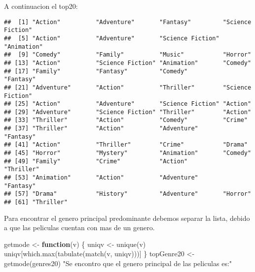 \documentclass[
]{article}
\newenvironment{Shaded}{\begin{snugshade}}{\end{snugshade}}
\newcommand{\AttributeTok}[1]{\textcolor[rgb]{0.77,0.63,0.00}{#1}}
\newcommand{\ConstantTok}[1]{\textcolor[rgb]{0.00,0.00,0.00}{#1}}
\newcommand{\ControlFlowTok}[1]{\textcolor[rgb]{0.13,0.29,0.53}{\textbf{#1}}}
\newcommand{\DecValTok}[1]{\textcolor[rgb]{0.00,0.00,0.81}{#1}}
\newcommand{\FunctionTok}[1]{\textcolor[rgb]{0.00,0.00,0.00}{#1}}
\newcommand{\NormalTok}[1]{#1}
\newcommand{\OtherTok}[1]{\textcolor[rgb]{0.56,0.35,0.01}{#1}}
\newcommand{\SpecialCharTok}[1]{\textcolor[rgb]{0.00,0.00,0.00}{#1}}
\newcommand{\StringTok}[1]{\textcolor[rgb]{0.31,0.60,0.02}{#1}}
\begin{document}
A continuacion el top20:

\begin{Shaded}
\end{Shaded}

\begin{verbatim}
##  [1] "Action"          "Adventure"       "Fantasy"         "Science Fiction"
##  [5] "Action"          "Adventure"       "Science Fiction" "Animation"      
##  [9] "Comedy"          "Family"          "Music"           "Horror"         
## [13] "Action"          "Science Fiction" "Animation"       "Comedy"         
## [17] "Family"          "Fantasy"         "Comedy"          "Fantasy"        
## [21] "Adventure"       "Action"          "Thriller"        "Science Fiction"
## [25] "Action"          "Adventure"       "Science Fiction" "Action"         
## [29] "Adventure"       "Science Fiction" "Thriller"        "Action"         
## [33] "Thriller"        "Action"          "Comedy"          "Crime"          
## [37] "Thriller"        "Action"          "Adventure"       "Fantasy"        
## [41] "Action"          "Thriller"        "Crime"           "Drama"          
## [45] "Horror"          "Mystery"         "Animation"       "Comedy"         
## [49] "Family"          "Crime"           "Action"          "Thriller"       
## [53] "Animation"       "Action"          "Adventure"       "Fantasy"        
## [57] "Drama"           "History"         "Adventure"       "Horror"         
## [61] "Thriller"
\end{verbatim}

Para encontrar el genero principal predominante debemos separar la
lista, debido a que las peliculas cuentan con mas de un genero.

\begin{Shaded}
\begin{Highlighting}[]
\NormalTok{getmode }\OtherTok{\textless{}{-}} \ControlFlowTok{function}\NormalTok{(v) \{}
\NormalTok{  uniqv }\OtherTok{\textless{}{-}} \FunctionTok{unique}\NormalTok{(v)}
\NormalTok{  uniqv[}\FunctionTok{which.max}\NormalTok{(}\FunctionTok{tabulate}\NormalTok{(}\FunctionTok{match}\NormalTok{(v, uniqv)))]}
\NormalTok{\}}
\NormalTok{topGenre20 }\OtherTok{\textless{}{-}} \FunctionTok{getmode}\NormalTok{(genres20)}
\StringTok{"Se encontro que el genero principal de las peliculas es:"}
\end{Highlighting}
\end{Shaded}
\end{document}
